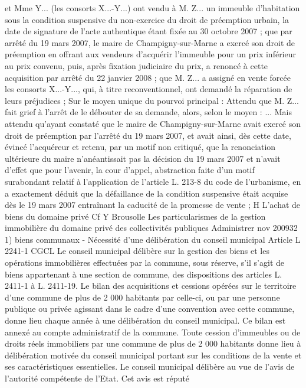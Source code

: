 \documentclass[11pt,a4paper]{report}
\begin{document}
	et Mme Y... (les consorts X...-Y...) ont vendu à M. Z... un immeuble d'habitation sous la condition suspensive du
	non-exercice du droit de préemption urbain, la date de signature de l'acte authentique étant fixée au 30 octobre
	2007 ; que par arrêté du 19 mars 2007, le maire de Champigny-sur-Marne a exercé son droit de préemption en
	offrant aux vendeurs d'acquérir l'immeuble pour un prix inférieur au prix convenu, puis, après fixation judiciaire
	du prix, a renoncé à cette acquisition par arrêté du 22 janvier 2008 ; que M. Z... a assigné en vente forcée les
	consorts X...-Y..., qui, à titre reconventionnel, ont demandé la réparation de leurs préjudices ;
	Sur le moyen unique du pourvoi principal :
	Attendu que M. Z... fait grief à l'arrêt de le débouter de sa demande, alors, selon le moyen :
	...
	Mais attendu qu'ayant constaté que le maire de Champigny-sur-Marne avait exercé son droit de préemption par
	l'arrêté du 19 mars 2007, et avait ainsi, dès cette date, évincé l'acquéreur et retenu, par un motif non critiqué,
	que la renonciation ultérieure du maire n'anéantissait pas la décision du 19 mars 2007 et n'avait d'effet que pour
	l'avenir, la cour d'appel, abstraction faite d'un motif surabondant relatif à l'application de l'article L. 213-8 du
	code de l'urbanisme, en a exactement déduit que la défaillance de la condition suspensive était acquise dès le 19
	mars 2007 entraînant la caducité de la promesse de vente ;
	H L’achat de biens du domaine privé
	Cf Y Brousolle Les particularismes de la gestion immobilière du domaine privé des collectivités publiques
	Administrer nov 200932
	1) biens communaux
	- Nécessité d’une délibération du conseil municipal Article L 2241-1 CGCL
	Le conseil municipal délibère sur la gestion des biens et les opérations immobilières effectuées par la commune,
	sous réserve, s'il s'agit de biens appartenant à une section de commune, des dispositions des articles L. 2411-1 à
	L. 2411-19.
	Le bilan des acquisitions et cessions opérées sur le territoire d'une commune de plus de 2 000 habitants par
	celle-ci, ou par une personne publique ou privée agissant dans le cadre d'une convention avec cette commune,
	donne lieu chaque année à une délibération du conseil municipal. Ce bilan est annexé au compte administratif
	de la commune.
	Toute cession d'immeubles ou de droits réels immobiliers par une commune de plus de 2 000 habitants donne
	lieu à délibération motivée du conseil municipal portant sur les conditions de la vente et ses caractéristiques
	essentielles. Le conseil municipal délibère au vue de l'avis de l'autorité compétente de l'Etat. Cet avis est réputé
\end{document}
